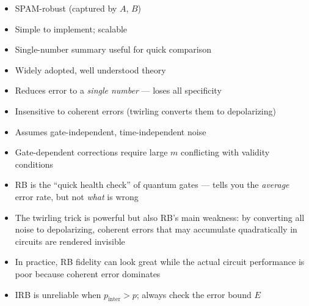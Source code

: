 \documentclass[10pt,a4paper]{article}
\begin{document}
\begin{minipage}[t]{0.48\textwidth}
\begin{prosbox}
\begin{itemize}
  \item SPAM-robust (captured by $A$, $B$)
  \item Simple to implement; scalable
  \item Single-number summary useful for quick comparison
  \item Widely adopted, well understood theory
\end{itemize}
\end{prosbox}
\end{minipage}
\hfill
\begin{minipage}[t]{0.48\textwidth}
\begin{consbox}
\begin{itemize}
  \item Reduces error to a \emph{single number} --- loses all specificity
  \item Insensitive to coherent errors (twirling converts them to depolarizing)
  \item Assumes gate-independent, time-independent noise
  \item Gate-dependent corrections require large $m$ conflicting with validity conditions
\end{itemize}
\end{consbox}
\end{minipage}

\begin{insightbox}
\begin{itemize}
  \item RB is the ``quick health check'' of quantum gates --- tells you the \emph{average} error rate, but not \emph{what} is wrong
  \item The twirling trick is powerful but also RB's main weakness: by converting all noise to depolarizing, \textcolor{alertred}{coherent errors that may accumulate quadratically in circuits are rendered invisible}
  \item In practice, RB fidelity can look great while the actual circuit performance is poor because coherent error dominates
  \item IRB is unreliable when $p_{\mathrm{inter}} > p$; always check the error bound $E$
\end{itemize}
\end{insightbox}

\newpage

\end{document}
